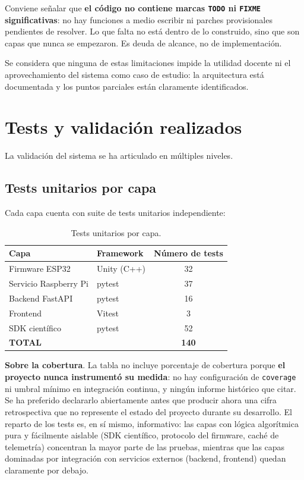 Conviene se\~nalar que \textbf{el c\'odigo no contiene marcas
\texttt{TODO} ni \texttt{FIXME} significativas}: no hay funciones a
medio escribir ni parches provisionales pendientes de resolver. Lo que
falta no est\'a dentro de lo construido, sino que son capas que nunca se
empezaron. Es deuda de alcance, no de implementaci\'on.

Se considera que ninguna de estas limitaciones impide la utilidad
docente ni el aprovechamiento del sistema como caso de estudio: la
arquitectura est\'a documentada y los puntos parciales est\'an claramente
identificados.

\section{Tests y validaci\'on realizados}

La validaci\'on del sistema se ha articulado en m\'ultiples niveles.

\subsection{Tests unitarios por capa}

Cada capa cuenta con suite de tests unitarios independiente:

\begin{table}[H]
    \centering
    \caption{Tests unitarios por capa.}
    \label{tab:cobertura_tests}
    \begin{tabular}{llc}
        \toprule
        \textbf{Capa} & \textbf{Framework} & \textbf{N\'umero de tests} \\
        \midrule
        Firmware ESP32        & Unity (C++)     & 32 \\
        Servicio Raspberry Pi & pytest          & 37 \\
        Backend FastAPI       & pytest          & 16 \\
        Frontend              & Vitest          & 3 \\
        SDK cient\'ifico      & pytest          & 52 \\
        \midrule
        \textbf{TOTAL}        &                 & \textbf{140} \\
        \bottomrule
    \end{tabular}
\end{table}

\textbf{Sobre la cobertura}. La tabla no incluye porcentaje de cobertura
porque \textbf{el proyecto nunca instrument\'o su medida}: no hay
configuraci\'on de \texttt{coverage} ni umbral m\'inimo en integraci\'on
continua, y ning\'un informe hist\'orico que citar. Se ha preferido
declararlo abiertamente antes que producir ahora una cifra retrospectiva
que no represente el estado del proyecto durante su desarrollo. El
reparto de los tests es, en s\'i mismo, informativo: las capas con
l\'ogica algor\'itmica pura y f\'acilmente aislable (SDK cient\'ifico,
protocolo del firmware, cach\'e de telemetr\'ia) concentran la mayor
parte de las pruebas, mientras que las capas dominadas por integraci\'on
con servicios externos (backend, frontend) quedan claramente por debajo.

